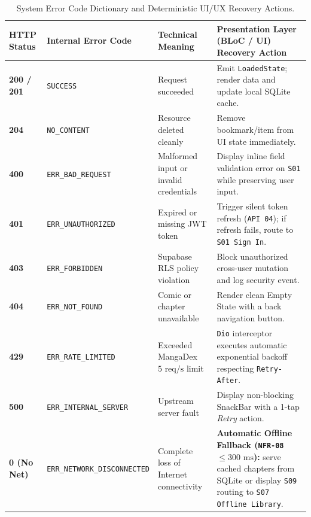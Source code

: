\begin{table}[H]
\centering
\caption{System Error Code Dictionary and Deterministic UI/UX Recovery Actions.}
\label{tab:error_codes}
\footnotesize
\renewcommand{\arraystretch}{1.22}
\begin{tabularx}{\textwidth}{C{1.8cm} L{4.2cm} L{3.6cm} Y}
\toprule
{}
\textbf{HTTP Status} & \textbf{Internal Error Code} & \textbf{Technical Meaning} & \textbf{Presentation Layer (BLoC / UI) Recovery Action} \\
\midrule
\textbf{200 / 201} & \texttt{SUCCESS} & Request succeeded & Emit \texttt{LoadedState}; render data and update local SQLite cache. \\
\textbf{204} & \texttt{NO\_CONTENT} & Resource deleted cleanly & Remove bookmark/item from UI state immediately. \\
\textbf{400} & \texttt{ERR\_BAD\_REQUEST} & Malformed input or invalid credentials & Display inline field validation error on \texttt{S01} while preserving user input. \\
\textbf{401} & \texttt{ERR\_UNAUTHORIZED} & Expired or missing JWT token & Trigger silent token refresh (\texttt{API 04}); if refresh fails, route to \texttt{S01 Sign In}. \\
\textbf{403} & \texttt{ERR\_FORBIDDEN} & Supabase RLS policy violation & Block unauthorized cross-user mutation and log security event. \\
\textbf{404} & \texttt{ERR\_NOT\_FOUND} & Comic or chapter unavailable & Render clean Empty State with a back navigation button. \\
\textbf{429} & \texttt{ERR\_RATE\_LIMITED} & Exceeded MangaDex $5\text{ req/s}$ limit & \texttt{Dio} interceptor executes automatic exponential backoff respecting \texttt{Retry-After}. \\
\textbf{500} & \texttt{ERR\_INTERNAL\_SERVER} & Upstream server fault & Display non-blocking SnackBar with a 1-tap \textit{Retry} action. \\
\textbf{0 (No Net)} & \texttt{ERR\_NETWORK\_DISCONNECTED} & Complete loss of Internet connectivity & \textbf{Automatic Offline Fallback (\texttt{NFR-08} $\le 300\text{ ms}$):} serve cached chapters from SQLite or display \texttt{S09} routing to \texttt{S07 Offline Library}. \\
\bottomrule
\end{tabularx}
\end{table}
